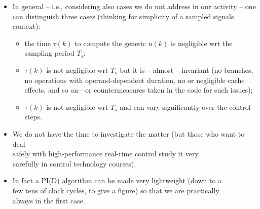 \begin{frame}
\myPause
 \begin{itemize}[<+-| alert@+>]
 \item In general -- i.e., considering also cases we do not address in our activity -- one can distinguish
       three cases (thinking for simplicity of a sampled signals context):
       \begin{itemize}[<+-| alert@+>]
       \item the time $\tau(k)$ to compute the generic $u(k)$ is negligible wrt the sampling period $T_s$;
       \item $\tau(k)$ is not negligible wrt $T_s$ but it is -- almost -- invariant (no branches, no operations
             with operand-dependent duration, no or negligible cache effects, and so on---or countermeasures taken
             in the code for such issues);
       \item $\tau(k)$ is not negligible wrt $T_s$ and can vary significantly over the control steps.
       \end{itemize}
 \item We do not have the time to investigate the matter (but those who want to deal\\
       safely with high-performance real-time control  study it very\\
       carefully in control technology courses).
 \item In fact a PI(D) algorithm can be made very lightweight (down to a\\
       few tens of clock cycles, to give a figure) so that we are practically\\
       always in the first case.
 \end{itemize}
\end{frame}


